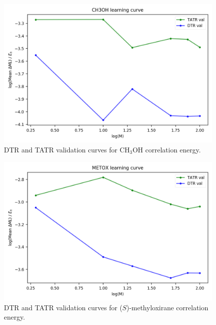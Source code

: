\begin{figure}
    \centering
    \includegraphics[scale=1.0]{p2/figures/si/CH3OH_learn_log_e.png}
    \caption{DTR and TATR validation curves for CH$_3$OH correlation energy.}
\end{figure}

\begin{figure}
    \centering
    \includegraphics[scale=1.0]{p2/figures/si/METOX_learn_log_e.png}
    \caption{DTR and TATR validation curves for ($\textit{S}$)-methyloxirane correlation energy.}
\end{figure}

